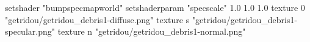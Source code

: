 setshader "bumpspecmapworld"
setshaderparam "specscale" 1.0 1.0 1.0
texture 0 "getridou/getridou_debris1-diffuse.png"
texture s "getridou/getridou_debris1-specular.png"
texture n "getridou/getridou_debris1-normal.png"